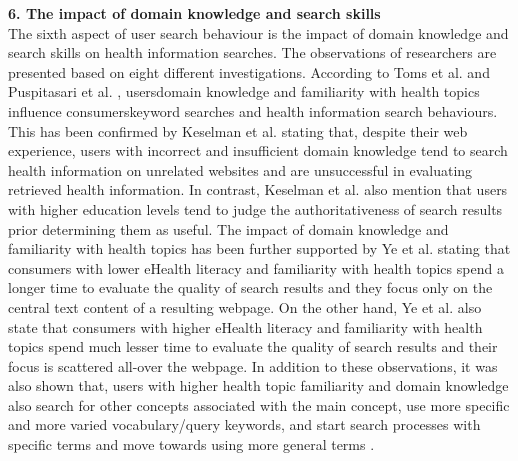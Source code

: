 \documentclass[]{article}
\begin{document}
\vspace{0.25cm}

\textbf{6. The impact of domain knowledge and search skills}\\


The sixth aspect of user search behaviour is the impact of domain knowledge and search skills on health information searches. The observations of researchers are presented based on eight different investigations. According to Toms et al. and Puspitasari et al. \cite{puspitasari2013characterizing,toms2007consumers}, users\textquotesingle domain knowledge and familiarity with health topics influence consumers\textquotesingle keyword searches and health information search behaviours. This has been confirmed by Keselman et al. \cite{keselman2008consumer} stating that, despite their web experience, users with incorrect and insufficient domain knowledge tend to search health information on unrelated websites and are unsuccessful in evaluating retrieved health information. In contrast, Keselman et al. \cite{keselman2008consumer} also mention that users with higher education levels tend to judge the authoritativeness of search results prior determining them as useful. The impact of domain knowledge and familiarity with health topics has been further supported by Ye et al. \cite{ye2017towards} stating that consumers with lower eHealth literacy and familiarity with health topics spend a longer time to evaluate the quality of search results and they focus only on the central text content of a resulting webpage. On the other hand, Ye et al. \cite{ye2017towards} also state that consumers with higher eHealth literacy and  familiarity with health topics spend much lesser time to evaluate the quality of search results and their focus is scattered all-over the webpage. In addition to these observations, it was also shown that, users with higher health topic familiarity and domain knowledge also search for other concepts associated with the main concept, use more specific and more varied vocabulary/query keywords, and start search processes with specific terms and move towards using more general terms \cite{zhang2012health,puspitasari2013characterizing,hu2013effects}. 
\end{document}
